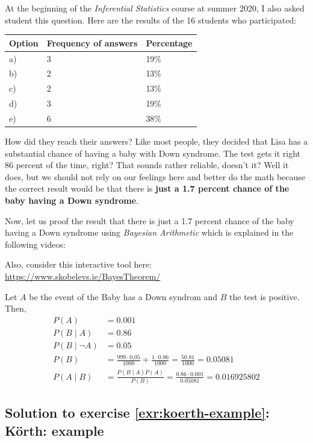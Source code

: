 \documentclass[
  12pt,
  oneside]{book}
\theoremstyle{definition}
\theoremstyle{definition}
\theoremstyle{definition}
\theoremstyle{definition}
\theoremstyle{remark}
\begin{document}
At the beginning of the \emph{Inferential Statistics} course at summer 2020, I also asked student this question. Here are the results of the 16 students who participated:

\begin{longtable}[]{@{}lll@{}}
\toprule\noalign{}
Option & Frequency of answers & Percentage \\
\midrule\noalign{}
\endhead
\bottomrule\noalign{}
\endlastfoot
a) & 3 & 19\% \\
b) & 2 & 13\% \\
c) & 2 & 13\% \\
d) & 3 & 19\% \\
e) & 6 & 38\% \\
\end{longtable}

How did they reach their answers? Like most people, they decided that Lisa has a substantial chance of having a baby with Down syndrome. The test gets it right 86 percent of the time, right? That sounds rather reliable, doesn't it? Well it does, but we should not rely on our feelings here and better do the math because the correct result would be that there is \textbf{just a 1.7 percent chance of the baby having a Down syndrome}.

Now, let us proof the result that there is just a 1.7 percent chance of the baby having a Down syndrome using \emph{Bayesian Arithmetic} which is explained in the following videos:

Also, consider this interactive tool here: \url{https://www.skobelevs.ie/BayesTheorem/}

Let \(A\) be the event of the Baby has a Down syndrom and \(B\) the test is positive. Then,
\begin{align*}
    P(A)&=0.001\\
    P(B\mid A)&=0.86\\
    P(B\mid \neg A)&=0.05\\
    P(B)&=\frac{999\cdot 0.05}{1000}+\frac{1\cdot 0.86}{1000}=\frac{50.81}{1000}=0.05081\\
    P(A\mid B)&={\frac {P(B\mid A)P(A)}{P(B)}}=\frac{0.86 \cdot 0.001}{0.05081}=0.016925802
\end{align*}

\subsection*{Solution to exercise \ref{exr:koerth-example}: Körth: example}\label{sol:koerth-example}
\end{document}
